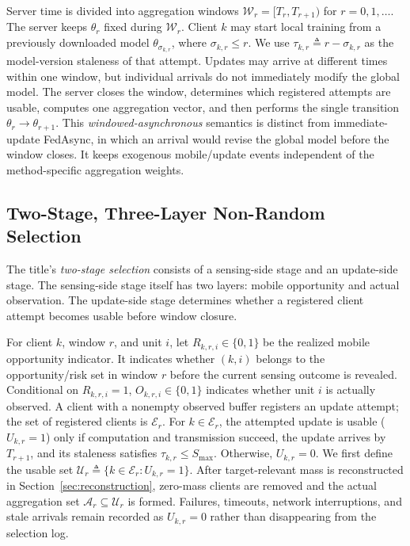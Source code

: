 \documentclass[letterpaper,journal]{IEEEtran}
\begin{document}
Server time is divided into aggregation windows
$\mathcal{W}_r=[T_r,T_{r+1})$ for $r=0,1,\ldots$.
The server keeps $\theta_r$ fixed during $\mathcal{W}_r$.  Client $k$ may start
local training from a previously downloaded model $\theta_{\sigma_{k,r}}$,
where $\sigma_{k,r}\le r$.  We use
$\tau_{k,r}\triangleq r-\sigma_{k,r}$
as the model-version staleness of that attempt.  Updates may arrive at
different times within one window, but individual arrivals do not
immediately modify the global model.  The server closes the window,
determines which registered attempts are usable, computes one
aggregation vector, and then performs the single transition
$\theta_r\rightarrow\theta_{r+1}$.  This \emph{windowed-asynchronous}
semantics is distinct from immediate-update FedAsync, in which an
arrival would revise the global model before the window closes.  It
keeps exogenous mobile/update events independent of the method-specific
aggregation weights.

\subsection{Two-Stage, Three-Layer Non-Random Selection}
\label{subsec:selection_process}

The title's \emph{two-stage selection} consists of a sensing-side stage and an
update-side stage.  The sensing-side stage itself has two layers: mobile
opportunity and actual observation.  The update-side stage determines whether a
registered client attempt becomes usable before window closure.

For client $k$, window $r$, and unit $i$, let
$R_{k,r,i}\in\{0,1\}$ be the realized mobile opportunity indicator.
It indicates whether $(k,i)$ belongs to the opportunity/risk set in
window $r$ before the current sensing outcome is revealed.
Conditional on $R_{k,r,i}=1$,
$O_{k,r,i}\in\{0,1\}$
indicates whether unit $i$ is actually observed.  A client with a
nonempty observed buffer registers an update attempt; the set of
registered clients is $\mathcal{E}_r$.  For $k\in\mathcal{E}_r$, the
attempted update is usable ($U_{k,r}=1$) only if computation and
transmission succeed, the update arrives by $T_{r+1}$, and its
staleness satisfies $\tau_{k,r}\le S_{\max}$.  Otherwise,
$U_{k,r}=0$.  We first define the usable set
$\mathcal{U}_r\triangleq\{k\in\mathcal{E}_r:U_{k,r}=1\}$.
After target-relevant mass is reconstructed in
Section~\ref{sec:reconstruction}, zero-mass clients are removed and the
actual aggregation set $\mathcal{A}_r\subseteq\mathcal{U}_r$ is formed.
Failures, timeouts, network interruptions, and stale arrivals remain
recorded as $U_{k,r}=0$ rather than disappearing from the selection
log.
\end{document}
